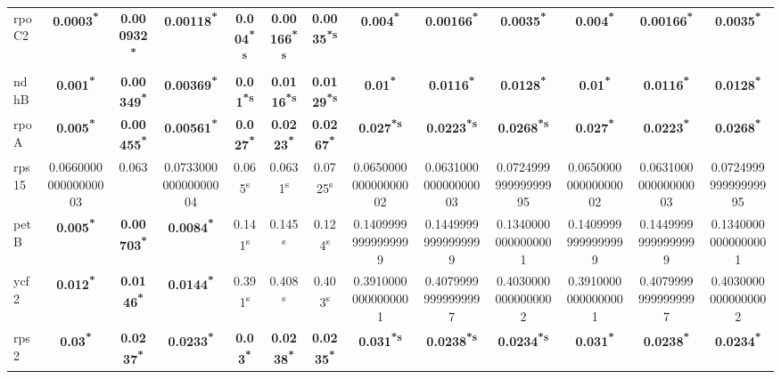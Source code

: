 \documentclass[a4paper]{article}
\begin{document}
\begin{longtable}{l|c|c|c|c|c|c|c|c|c|c|c|c}
rpoC2&\textbf{0.0003\textsuperscript{*}}&\textbf{0.000932\textsuperscript{*}}&\textbf{0.00118\textsuperscript{*}}&\textbf{0.004\textsuperscript{*}\textsuperscript{s}}&\textbf{0.00166\textsuperscript{*}\textsuperscript{s}}&\textbf{0.0035\textsuperscript{*}\textsuperscript{s}}&\textbf{0.004\textsuperscript{*}}&\textbf{0.00166\textsuperscript{*}}&\textbf{0.0035\textsuperscript{*}}&\textbf{0.004\textsuperscript{*}}&\textbf{0.00166\textsuperscript{*}}&\textbf{0.0035\textsuperscript{*}}\\
ndhB&\textbf{0.001\textsuperscript{*}}&\textbf{0.00349\textsuperscript{*}}&\textbf{0.00369\textsuperscript{*}}&\textbf{0.01\textsuperscript{*}\textsuperscript{s}}&\textbf{0.0116\textsuperscript{*}\textsuperscript{s}}&\textbf{0.0129\textsuperscript{*}\textsuperscript{s}}&\textbf{0.01\textsuperscript{*}}&\textbf{0.0116\textsuperscript{*}}&\textbf{0.0128\textsuperscript{*}}&\textbf{0.01\textsuperscript{*}}&\textbf{0.0116\textsuperscript{*}}&\textbf{0.0128\textsuperscript{*}}\\
rpoA&\textbf{0.005\textsuperscript{*}}&\textbf{0.00455\textsuperscript{*}}&\textbf{0.00561\textsuperscript{*}}&\textbf{0.027\textsuperscript{*}}&\textbf{0.0223\textsuperscript{*}}&\textbf{0.0267\textsuperscript{*}}&\textbf{0.027\textsuperscript{*}\textsuperscript{s}}&\textbf{0.0223\textsuperscript{*}\textsuperscript{s}}&\textbf{0.0268\textsuperscript{*}\textsuperscript{s}}&\textbf{0.027\textsuperscript{*}}&\textbf{0.0223\textsuperscript{*}}&\textbf{0.0268\textsuperscript{*}}\\
rps15&0.066000000000000003&0.063&0.073300000000000004&0.065\textsuperscript{s}&0.0631\textsuperscript{s}&0.0725\textsuperscript{s}&0.065000000000000002&0.063100000000000003&0.072499999999999995&0.065000000000000002&0.063100000000000003&0.072499999999999995\\
petB&\textbf{0.005\textsuperscript{*}}&\textbf{0.00703\textsuperscript{*}}&\textbf{0.0084\textsuperscript{*}}&0.141\textsuperscript{s}&0.145\textsuperscript{s}&0.124\textsuperscript{s}&0.14099999999999999&0.14499999999999999&0.13400000000000001&0.14099999999999999&0.14499999999999999&0.13400000000000001\\
ycf2&\textbf{0.012\textsuperscript{*}}&\textbf{0.0146\textsuperscript{*}}&\textbf{0.0144\textsuperscript{*}}&0.391\textsuperscript{s}&0.408\textsuperscript{s}&0.403\textsuperscript{s}&0.39100000000000001&0.40799999999999997&0.40300000000000002&0.39100000000000001&0.40799999999999997&0.40300000000000002\\
rps2&\textbf{0.03\textsuperscript{*}}&\textbf{0.0237\textsuperscript{*}}&\textbf{0.0233\textsuperscript{*}}&\textbf{0.03\textsuperscript{*}}&\textbf{0.0238\textsuperscript{*}}&\textbf{0.0235\textsuperscript{*}}&\textbf{0.031\textsuperscript{*}\textsuperscript{s}}&\textbf{0.0238\textsuperscript{*}\textsuperscript{s}}&\textbf{0.0234\textsuperscript{*}\textsuperscript{s}}&\textbf{0.031\textsuperscript{*}}&\textbf{0.0238\textsuperscript{*}}&\textbf{0.0234\textsuperscript{*}}\\

\end{longtable}
\end{document}
